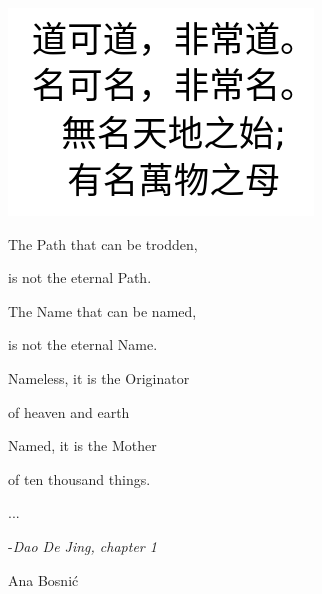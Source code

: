 




\begin{center}{\it

	\includegraphics[scale=0.5]{./Images/Chinese.jpeg}



The Path that can be trodden, 

is not the eternal Path. 

The Name that can be named, 

is not the eternal Name. 

Nameless, it is the Originator  

of heaven and earth 

Named, it is the Mother  

of ten thousand things. 
}

...


-{\it Dao De Jing, chapter 1}

\end{center}



\hfill Ana Bosni\'{c}
